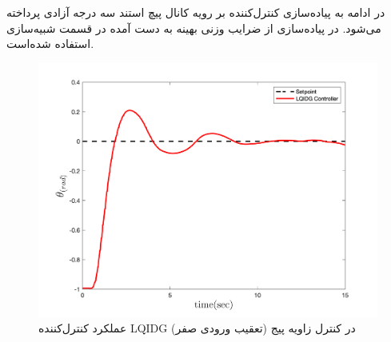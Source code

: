 در ادامه به پیاده‌سازی کنترل‌کننده  بر رویه کانال پیچ استند سه درجه آزادی پرداخته می‌شود.
در پیاده‌سازی از ضرایب وزنی بهینه به دست آمده در قسمت شبیه‌سازی استفاده شده‌است.
\begin{figure}[H]
	\includegraphics[width=.48\linewidth]{../Figures/Calibration/LQIDG/Pitch/lqidg_pitch.png}
	\centering
	\caption{عملكرد کنترل‌کننده  LQIDG در کنترل زاويه پیج (تعقیب ورودی صفر)}
\end{figure}



